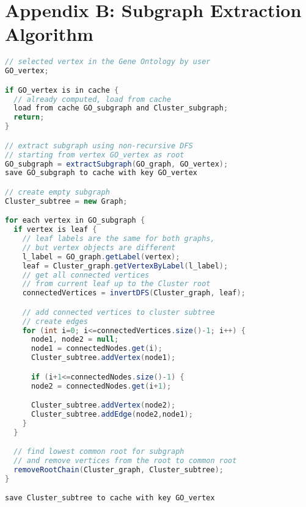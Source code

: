\section*{Appendix B: Subgraph Extraction Algorithm}
\label{sec:appendix_B}

\begin{center}
\small
\begin{lstlisting}[language=Java]
// selected vertex in the Gene Ontology by user
GO_vertex;

if GO_vertex is in cache {
  // already computed, load from cache
  load from cache GO_subgraph and Cluster_subgraph;
  return;
}

// extract subgraph using non-recursive DFS
// starting from vertex GO_vertex as root
GO_subgraph = extractSubgraph(GO_graph, GO_vertex);
save GO_subgraph to cache with key GO_vertex

// create empty subgraph
Cluster_subtree = new Graph;

for each vertex in GO_subgraph {
  if vertex is leaf {
    // leaf labels are the same for both graphs,
    // but vertex objects are different
    l_label = GO_graph.getLabel(vertex);
    leaf = Cluster_graph.getVertexByLabel(l_label);
    // get all connected vertices
    // from current leaf up to the Cluster root
    connectedVertices = invertDFS(Cluster_graph, leaf);

    // add connected vertices to cluster subtree
    // create edges
    for (int i=0; i<=connectedVertices.size()-1; i++) {
      node1, node2 = null;
      node1 = connectedNodes.get(i);
      Cluster_subtree.addVertex(node1);

      if (i+1<=connectedNodes.size()-1) {
      node2 = connectedNodes.get(i+1);

      Cluster_subtree.addVertex(node2);
      Cluster_subtree.addEdge(node2,node1);
    }
  }

  // find lowest common root for subgraph
  // and remove vertices from the root to common root
  removeRootChain(Cluster_graph, Cluster_subtree);
}

save Cluster_subtree to cache with key GO_vertex
\end{lstlisting}
\end{center}
